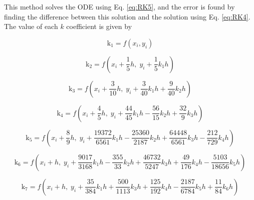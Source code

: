 \documentclass[12pt]{report}
\begin{document}
This method solves the ODE
using Eq. \ref{eq:RK5}, and the error is found by finding the difference between this solution and the solution using
Eq. \ref{eq:RK4}. The value of each $k$ coefficient is given by

\begin{equation} \label{eq:k1}
\mathrm k_1=f(x_i,y_i)
\end{equation}

\begin{equation} \label{eq:k2}
\mathrm k_2=f\left(x_i + \frac{1}{5}h,\;
                    y_i + \frac{1}{5}k_1 h\right)
\end{equation}

\begin{equation} \label{eq:k3}
\mathrm k_3=f\left(x_i + \frac{3}{10}h,\;
                    y_i + \frac{3}{40}k_1 h + \frac{9}{40}k_2 h\right)
\end{equation}

\begin{equation} \label{eq:k4}
\mathrm k_4=f\left(x_i + \frac{4}{5}h,\;
                    y_i + \frac{44}{45}k_1 h
                        - \frac{56}{15}k_2 h
                        + \frac{32}{9}k_3 h\right)
\end{equation}

\begin{equation} \label{eq:k5}
\mathrm k_5=f\left(x_i + \frac{8}{9}h,\;
                    y_i + \frac{19372}{6561}k_1 h
                        - \frac{25360}{2187}k_2 h
                        + \frac{64448}{6561}k_3 h
                        - \frac{212}{729}k_4 h\right)
\end{equation}

\begin{equation} \label{eq:k6}
\mathrm k_6=f\left(x_i + h,\;
                    y_i + \frac{9017}{3168}k_1 h
                        - \frac{355}{33}k_2 h
                        + \frac{46732}{5247}k_3 h
                        + \frac{49}{176}k_4 h
                        - \frac{5103}{18656}k_5 h\right)
\end{equation}

\begin{equation} \label{eq:k7}
\mathrm k_7=f\left(x_i + h,\;
                    y_i + \frac{35}{384}k_1 h
                        + \frac{500}{1113}k_3 h
                        + \frac{125}{192}k_4 h
                        - \frac{2187}{6784}k_5 h
                        + \frac{11}{84}k_6 h\right)
\end{equation}
\end{document}
